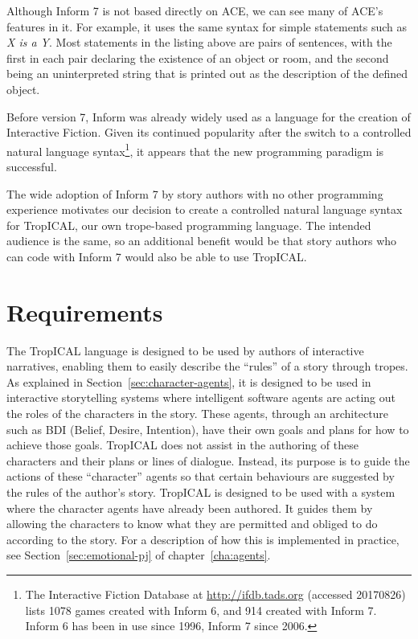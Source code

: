 \documentclass[11pt]{report}
\begin{document}
Although Inform 7 is not based directly on ACE, we can see many of ACE's
features in it. For example, it uses the same syntax for simple statements such
as \emph{X is a Y}. Most statements in the listing above are pairs of sentences,
with the first in each pair declaring the existence of an object or room, and
the second being an uninterpreted string that is printed out as the description
of the defined object.

Before version 7, Inform was already widely used as a language for the creation
of Interactive Fiction. Given its continued popularity after the switch to
a controlled natural language syntax\footnote{The Interactive Fiction Database
  at \url{http://ifdb.tads.org} (accessed 20170826) lists 1078 games created
  with Inform 6, and 914 created with Inform 7. Inform 6 has been in use since
  1996, Inform 7 since 2006.}, it appears that the new programming
paradigm is successful.

The wide adoption of Inform 7 by story authors with no other programming
experience motivates our decision to create a controlled natural language syntax
for TropICAL, our own trope-based programming language. The intended audience is
the same, so an additional benefit would be that story authors who can code with
Inform 7 would also be able to use TropICAL.

\section{Requirements}
\label{sec:t-requirements}

The TropICAL language is designed to be used by authors of interactive
narratives, enabling them to easily describe the ``rules'' of a story through
tropes. As explained in Section~\ref{sec:character-agents}, it is designed to be used in interactive storytelling systems where
intelligent software agents are acting out the roles of the characters in the
story. These agents, through an architecture such as BDI (Belief, Desire,
Intention), have their own goals and plans for how to achieve those goals.
TropICAL does not assist in the authoring of these characters and their plans or
lines of dialogue. Instead, its purpose is to guide the actions of these
``character'' agents so that certain behaviours are suggested by the rules of the author's
story. TropICAL is designed to be used with a system where the character agents have
already been authored. It guides them by allowing the characters to know what
they are permitted and obliged to do according to the story. For a description of how this is
implemented in practice, see Section~\ref{sec:emotional-pj} of
chapter~\ref{cha:agents}.
\end{document}
